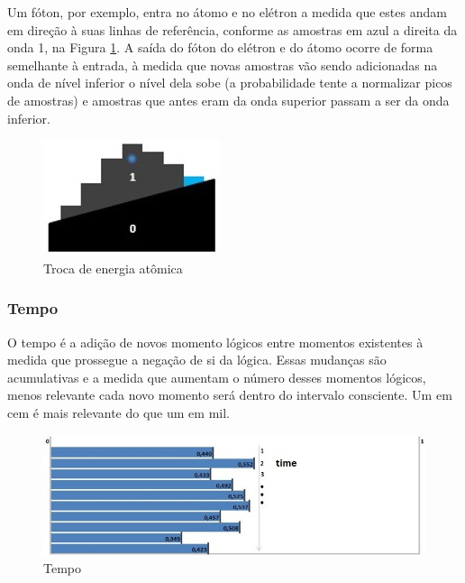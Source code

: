 Um fóton, por exemplo, entra no átomo e no elétron a medida que estes andam em direção à suas linhas de referência, conforme as amostras em azul a direita da onda 1, na Figura \ref{fig:consciousness_jump_photon.jpg}. A saída do fóton do elétron e do átomo ocorre de forma semelhante à entrada, à medida que novas amostras vão sendo adicionadas na onda de nível inferior o nível dela sobe (a probabilidade tente a normalizar picos de amostras) e amostras que antes eram da onda superior passam a ser da onda inferior.
	\begin{figure}[H]
	\caption{Troca de energia atômica}
	\label{fig:consciousness_jump_photon.jpg}
	\centering
	\includegraphics[scale=.8]{sections/images/consciousness_jump_photon.jpg}
	\end{figure}

\subsubsection{Tempo}
O tempo é a adição de novos momento lógicos entre momentos existentes à medida que prossegue a negação de si da lógica. Essas mudanças são acumulativas e a medida que aumentam o número desses momentos lógicos, menos relevante cada novo momento será dentro do intervalo consciente. Um em cem é mais relevante do que um em mil. 
	\begin{figure}[H]
	\caption{Tempo}
	\label{fig:consciousness_time}
	\centering
	\includegraphics[scale=.8]{sections/images/consciousness_time.jpg}
	\end{figure}


